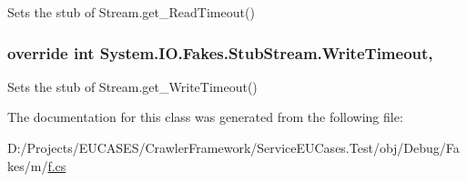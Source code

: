 Sets the stub of Stream.\-get\-\_\-\-Read\-Timeout()

\hypertarget{class_system_1_1_i_o_1_1_fakes_1_1_stub_stream_a323e383a9449ab5bcb90b91b5066055f}{
\subsubsection[{Write\-Timeout}]{\setlength{\rightskip}{0pt plus 5cm}override int System.\-I\-O.\-Fakes.\-Stub\-Stream.\-Write\-Timeout\hspace{0.3cm}{\ttfamily [get]}, {\ttfamily [set]}}}\label{class_system_1_1_i_o_1_1_fakes_1_1_stub_stream_a323e383a9449ab5bcb90b91b5066055f}


Sets the stub of Stream.\-get\-\_\-\-Write\-Timeout()



The documentation for this class was generated from the following file\-:\begin{DoxyCompactItemize}
\item 
D\-:/\-Projects/\-E\-U\-C\-A\-S\-E\-S/\-Crawler\-Framework/\-Service\-E\-U\-Cases.\-Test/obj/\-Debug/\-Fakes/m/\hyperlink{m_2f_8cs}{f.\-cs}\end{DoxyCompactItemize}
